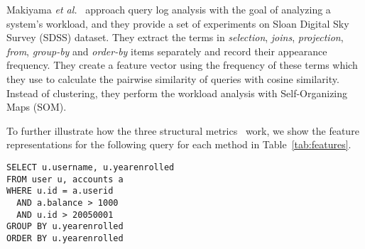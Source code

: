 Makiyama \textit{et al.}~\cite{makiyama2015text} approach query log analysis with the goal of analyzing a system's workload, and they provide a set of experiments on Sloan Digital Sky Survey (SDSS) dataset.
They extract the terms in \textit{selection}, \textit{joins}, \textit{projection}, \textit{from}, \textit{group-by} and \textit{order-by} items separately and record their appearance frequency.
They create a feature vector using the frequency of these terms which they use to calculate the pairwise similarity of queries with cosine similarity.
Instead of clustering, they perform the workload analysis with Self-Organizing Maps (SOM).

To further illustrate how the three structural metrics~\cite{aouiche2006, aligon2014similarity, makiyama2015text} work, we show the feature representations for the following query for each method in Table~\ref{tab:features}.
{\footnotesize
\begin{verbatim}
SELECT u.username, u.yearenrolled
FROM user u, accounts a
WHERE u.id = a.userid
  AND a.balance > 1000
  AND u.id > 20050001
GROUP BY u.yearenrolled
ORDER BY u.yearenrolled
\end{verbatim}
}

